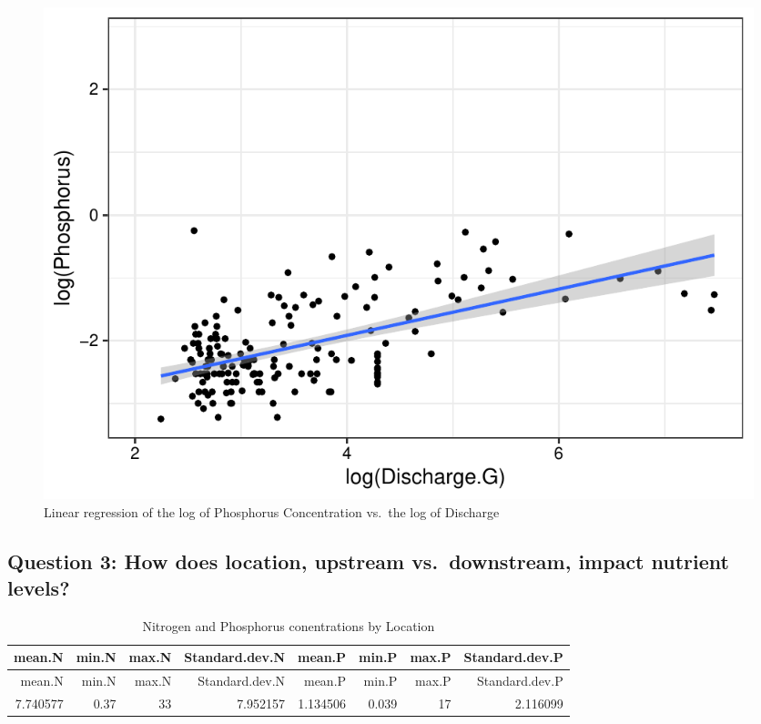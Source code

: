 \documentclass[12pt,]{article}
\begin{document}
\begin{figure}
\centering
\includegraphics{Landman_ENV872_Project_files/figure-latex/Data Analysis Figure 8-1.pdf}
\caption{Linear regression of the log of Phosphorus Concentration
vs.~the log of Discharge}
\end{figure}

\newpage

\hypertarget{question-3-how-does-location-upstream-vs.downstream-impact-nutrient-levels}{%
\subsection{Question 3: How does location, upstream vs.~downstream,
impact nutrient
levels?}\label{question-3-how-does-location-upstream-vs.downstream-impact-nutrient-levels}}

\begin{longtable}[]{@{}rrrrrrrr@{}}
\caption{Nitrogen and Phosphorus conentrations by
Location}\tabularnewline
\toprule
mean.N & min.N & max.N & Standard.dev.N & mean.P & min.P & max.P &
Standard.dev.P\tabularnewline
\midrule
\endfirsthead
\toprule
mean.N & min.N & max.N & Standard.dev.N & mean.P & min.P & max.P &
Standard.dev.P\tabularnewline
\midrule
\endhead
7.740577 & 0.37 & 33 & 7.952157 & 1.134506 & 0.039 & 17 &
2.116099\tabularnewline
\bottomrule
\end{longtable}
\end{document}

